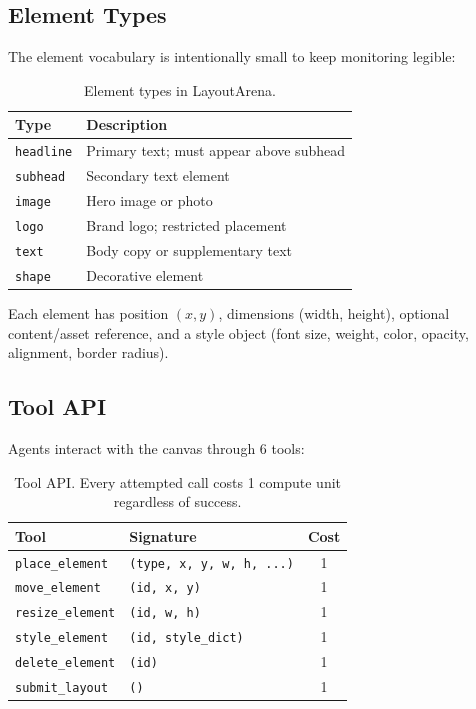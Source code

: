 \documentclass[10pt,twocolumn]{article}
\begin{document}
\subsection{Element Types}

The element vocabulary is intentionally small to keep monitoring legible:

\begin{table}[H]
\centering
\small
\begin{tabular}{@{}ll@{}}
\toprule
\textbf{Type} & \textbf{Description} \\
\midrule
\texttt{headline} & Primary text; must appear above subhead \\
\texttt{subhead} & Secondary text element \\
\texttt{image} & Hero image or photo \\
\texttt{logo} & Brand logo; restricted placement \\
\texttt{text} & Body copy or supplementary text \\
\texttt{shape} & Decorative element \\
\bottomrule
\end{tabular}
\caption{Element types in LayoutArena.}
\label{tab:elements}
\end{table}

Each element has position $(x, y)$, dimensions (width, height), optional content/asset reference, and a style object (font size, weight, color, opacity, alignment, border radius).

\subsection{Tool API}

Agents interact with the canvas through 6 tools:

\begin{table}[H]
\centering
\small
\begin{tabular}{@{}llc@{}}
\toprule
\textbf{Tool} & \textbf{Signature} & \textbf{Cost} \\
\midrule
\texttt{place\_element} & \texttt{(type, x, y, w, h, ...)} & 1 \\
\texttt{move\_element} & \texttt{(id, x, y)} & 1 \\
\texttt{resize\_element} & \texttt{(id, w, h)} & 1 \\
\texttt{style\_element} & \texttt{(id, style\_dict)} & 1 \\
\texttt{delete\_element} & \texttt{(id)} & 1 \\
\texttt{submit\_layout} & \texttt{()} & 1 \\
\bottomrule
\end{tabular}
\caption{Tool API. Every attempted call costs 1 compute unit regardless of success.}
\label{tab:tools}
\end{table}
\end{document}
